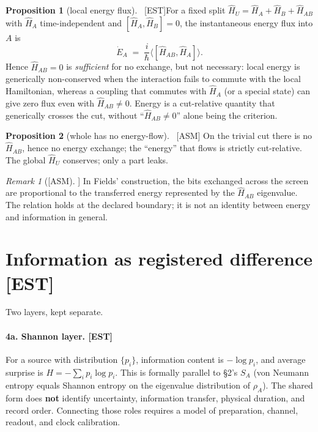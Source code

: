 \documentclass[11pt]{article}
\newcommand{\est}{\textcolor{teal!70!black}{\textsf{\small[EST]}}}
\newcommand{\fields}{\textcolor{violet}{\textsf{\small[FIELDS]}}}
\newcommand{\asm}{\textcolor{blue!70!black}{\textsf{\small[ASM]}}}
\def\est{[EST]}\def\fields{[FIELDS]}\def\asm{[ASM]}%
\def\quad{ }\def\normalsize{}%
\theoremstyle{definition}
\newtheorem{proposition}{Proposition}[section]
\theoremstyle{remark}
\newtheorem*{remark}{Remark}
\begin{document}
\begin{proposition}[local energy flux]{\normalfont\ \est}\label{prop:eflux}
For a fixed split $\hat{H}_U = \hat{H}_A + \hat{H}_B + \hat{H}_{AB}$ with $\hat{H}_A$ time-independent and $[\hat{H}_A,\hat{H}_B]=0$, the instantaneous energy flux into $A$ is
\[
  \dot{E}_A \;=\; \frac{i}{\hbar}\big\langle [\hat{H}_{AB}, \hat{H}_A]\big\rangle.
\]
Hence $\hat{H}_{AB}=0$ is \emph{sufficient} for no exchange, but not necessary: local energy is generically non-conserved when the interaction fails to commute with the local Hamiltonian, whereas a coupling that commutes with $\hat{H}_A$ (or a special state) can give zero flux even with $\hat{H}_{AB}\neq 0$. Energy is a cut-relative quantity that generically crosses the cut, without ``$\hat{H}_{AB}\neq 0$'' alone being the criterion.
\end{proposition}

\begin{proposition}[whole has no energy-flow]{\normalfont\ \asm}
On the trivial cut there is no $\hat{H}_{AB}$, hence no energy exchange; the ``energy'' that flows is strictly cut-relative. The global $\hat{H}_U$ conserves; only a part leaks.
\end{proposition}

\begin{remark}[\asm]
In Fields' construction, the bits exchanged across the screen are proportional to the transferred energy represented by the $\hat{H}_{AB}$ eigenvalue. The relation holds at the declared boundary; it is not an identity between energy and information in general.
\end{remark}

\section{Information as registered difference \quad{\normalsize\est}\label{sec:info}}

Two layers, kept separate.

\paragraph{4a. Shannon layer. \est}
For a source with distribution $\{p_i\}$, information content is $-\log p_i$, and average surprise is $H = -\sum_i p_i \log p_i$. This is formally parallel to \S2's $S_A$ (von Neumann entropy equals Shannon entropy on the eigenvalue distribution of $\rho_A$). The shared form does \textbf{not} identify uncertainty, information transfer, physical duration, and record order. Connecting those roles requires a model of preparation, channel, readout, and clock calibration.
\end{document}
